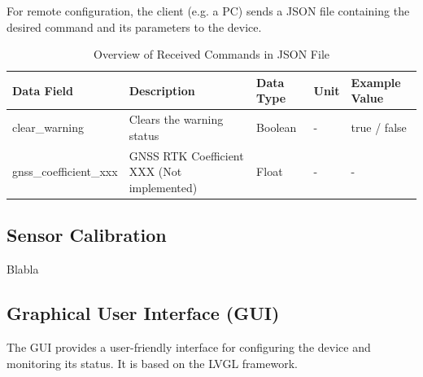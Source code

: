 For remote configuration, the client (e.g. a PC) sends a JSON file containing the desired command and its parameters to the device.

\begin{table}[h!]
	\tiny
	\centering
	\begin{tabular}{|l|l|l|l|l|}
		\hline
		\textbf{Data Field}    & \textbf{Description}                       & \textbf{Data Type} & \textbf{Unit} & \textbf{Example Value} \\ \hline
		clear\_warning         & Clears the warning status                  & Boolean            & -             & true / false           \\ \hline
		gnss\_coefficient\_xxx & GNSS RTK Coefficient XXX (Not implemented) & Float              & -             & -                      \\ \hline
	\end{tabular}
	\caption{Overview of Received Commands in JSON File}
	\label{tab:received_commands}
\end{table}

\subsection{Sensor Calibration} \label{sec:sensor_calibration}
Blabla


\subsection{Graphical User Interface (GUI)}
The GUI provides a user-friendly interface for configuring the device and monitoring its status.
It is based on the LVGL framework.

\newpage
